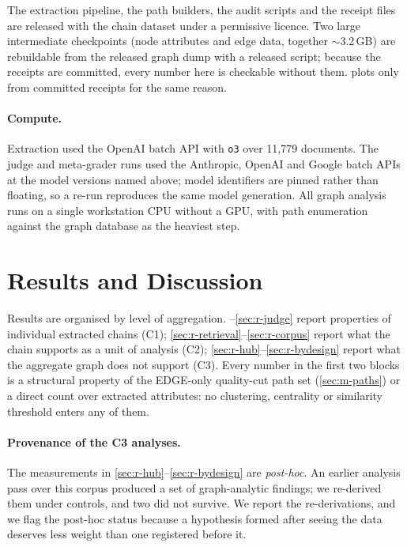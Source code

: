 \documentclass[10pt,twocolumn,letterpaper]{article}
\begin{document}
The extraction pipeline, the path builders, the audit scripts and the receipt files are
released with the chain dataset under a permissive licence. Two large intermediate
checkpoints (node attributes and edge data, together $\sim$3.2\,GB) are rebuildable from
the released graph dump with a released script; because the receipts are committed,
every number here is checkable without them.  plots only from
committed receipts for the same reason.

\paragraph{Compute.} Extraction used the OpenAI batch API with \texttt{o3} over 11{,}779
documents. The judge and meta-grader runs used the Anthropic, OpenAI and Google batch
APIs at the model versions named above; model identifiers are pinned rather than
floating, so a re-run reproduces the same model generation. All graph analysis runs on a
single workstation CPU without a GPU, with path enumeration against the graph database
as the heaviest step.

\section{Results and Discussion}
\label{sec:results}

Results are organised by level of aggregation. --\cref{sec:r-judge}
report properties of individual extracted chains (C1);
\cref{sec:r-retrieval}--\cref{sec:r-corpus} report what the chain supports as a unit of
analysis (C2); \cref{sec:r-hub}--\cref{sec:r-bydesign} report what the aggregate graph
does not support (C3). Every number in the first two blocks is a structural property of
the EDGE-only quality-cut path set (\cref{sec:m-paths}) or a direct count over extracted
attributes: no clustering, centrality or similarity threshold enters any of them.

\paragraph{Provenance of the C3 analyses.} The measurements in
\cref{sec:r-hub}--\cref{sec:r-bydesign} are \emph{post-hoc}. An earlier analysis pass
over this corpus produced a set of graph-analytic findings; we re-derived them under
controls, and two did not survive. We report the re-derivations, and we flag the
post-hoc status because a hypothesis formed after seeing the data deserves less weight
than one registered before it.
\end{document}
